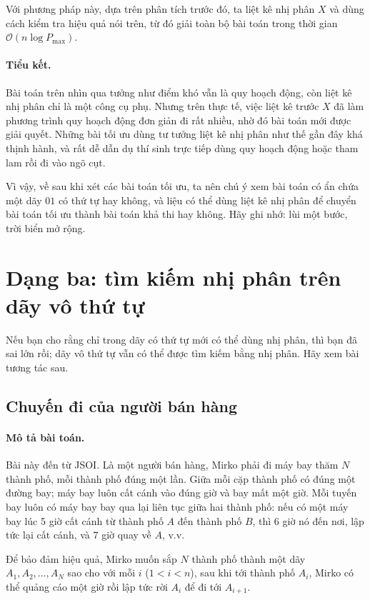 \documentclass[11pt]{article}
\newcommand{\Oh}{\mathcal{O}}
\begin{document}
Với phương pháp này, dựa trên phân tích trước đó, ta liệt kê nhị phân $X$ và
dùng cách kiểm tra hiệu quả nói trên, từ đó giải toàn bộ bài toán trong thời
gian $\Oh(n\log P_{\max})$.

\paragraph{Tiểu kết.}
Bài toán trên nhìn qua tưởng như điểm khó vẫn là quy hoạch động, còn liệt kê
nhị phân chỉ là một công cụ phụ. Nhưng trên thực tế, việc liệt kê trước $X$ đã
làm phương trình quy hoạch động đơn giản đi rất nhiều, nhờ đó bài toán mới
được giải quyết. Những bài tối ưu dùng tư tưởng liệt kê nhị phân như thế gần
đây khá thịnh hành, và rất dễ dẫn dụ thí sinh trực tiếp dùng quy hoạch động
hoặc tham lam rồi đi vào ngõ cụt.

Vì vậy, về sau khi xét các bài toán tối ưu, ta nên chú ý xem bài toán có ẩn
chứa một dãy $01$ có thứ tự hay không, và liệu có thể dùng liệt kê nhị phân để
chuyển bài toán tối ưu thành bài toán khả thi hay không. Hãy ghi nhớ: lùi một
bước, trời biển mở rộng.

\section{Dạng ba: tìm kiếm nhị phân trên dãy vô thứ tự}

Nếu bạn cho rằng chỉ trong dãy có thứ tự mới có thể dùng nhị phân, thì bạn đã
sai lớn rồi; dãy vô thứ tự vẫn có thể được tìm kiếm bằng nhị phân. Hãy xem bài
tương tác sau.

\subsection{Chuyến đi của người bán hàng}

\paragraph{Mô tả bài toán.}
Bài này đến từ JSOI. Là một người bán hàng, Mirko phải đi máy bay thăm $N$
thành phố, mỗi thành phố đúng một lần. Giữa mỗi cặp thành phố có đúng một
đường bay; máy bay luôn cất cánh vào đúng giờ và bay mất một giờ. Mỗi tuyến
bay luôn có máy bay bay qua lại liên tục giữa hai thành phố: nếu có một máy
bay lúc 5 giờ cất cánh từ thành phố $A$ đến thành phố $B$, thì 6 giờ nó đến
nơi, lập tức lại cất cánh, và 7 giờ quay về $A$, v.v.

Để bảo đảm hiệu quả, Mirko muốn sắp $N$ thành phố thành một dãy
$A_1,A_2,\ldots,A_N$ sao cho với mỗi $i$ ($1<i<n$), sau khi tới thành phố
$A_i$, Mirko có thể quảng cáo một giờ rồi lập tức rời $A_i$ để đi tới
$A_{i+1}$.
\end{document}
